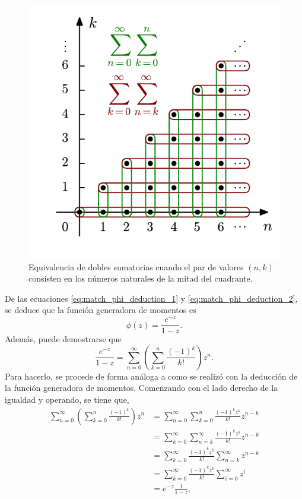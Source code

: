 \documentclass[a4paper]{report}
\begin{document}
\begin{figure}[!htb]
  \begin{minipage}[c]{0.4\textwidth}
    \includegraphics[width=\textwidth]{figuras/montmort_matching_double_summation.pdf}
  \end{minipage}\hfill
  \begin{minipage}[c]{0.5\textwidth}
    \caption{
       Equivalencia de dobles sumatorias cuando el par de valores \((n, k)\) consisten en los números naturales de la mitad del cuadrante.
    } \label{fig:montmort_matching_double_summation}
  \end{minipage}
\end{figure}
De las ecuaciones \ref{eq:match_phi_deduction_1} y \ref{eq:match_phi_deduction_2}, se deduce que la función generadora de momentos es
\[
 \phi(z)=\frac{e^{-z}}{1-z}.
\]
Además, puede demostrarse que
\begin{equation}\label{eq:match_generator_function}
 \frac{e^{-z}}{1-z}=\sum_{n=0}^{\infty}\left(\sum_{k=0}^{n}\frac{(-1)^k}{k!}\right)z^n.
\end{equation}
Para hacerlo, se procede de forma análoga a como se realizó con la deducción de la función generadora de momentos. Comenzando con el lado derecho de la igualdad y operando, se tiene que,
\begin{align*}
 \sum_{n=0}^{\infty}\left(\sum_{k=0}^{n}\frac{(-1)^k}{k!}\right)z^n
  &=\sum_{n=0}^{\infty}\sum_{k=0}^{n}\frac{(-1)^kz^{k}}{k!}z^{n-k}\\
  &=\sum_{k=0}^{\infty}\sum_{n=k}^{\infty}\frac{(-1)^kz^{k}}{k!}z^{n-k}\\
  &=\sum_{k=0}^{\infty}\frac{(-1)^kz^{k}}{k!}\sum_{n=k}^{\infty}z^{n-k}\\
  &=\sum_{k=0}^{\infty}\frac{(-1)^kz^{k}}{k!}\sum_{i=0}^{\infty}z^i\\
  &=e^{-z}\frac{1}{1-z},
\end{align*}
\end{document}
